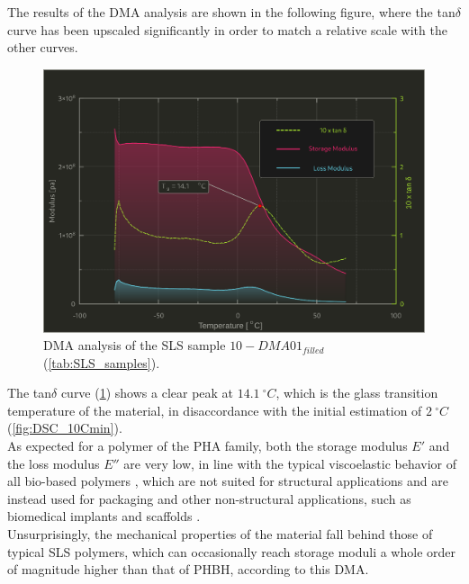 \documentclass{article}
\begin{document}
    The results of the DMA analysis are shown in the following figure, where the tan$\delta$ curve has been upscaled significantly 
    in order to match a relative scale with the other curves. \\ 

    \begin{figure}[h!]
        \centering
        \includegraphics[width=\textwidth]{Pictures/Thermal_analysis_plots/DMA.eps}
        \caption{DMA analysis of the SLS sample $10-DMA01_{filled}$ (\ref{tab:SLS_samples}).}
        \label{fig:DMA_plot}
    \end{figure}

    \clearpage 

    The tan$\delta$ curve (\ref{fig:DMA_plot}) shows a clear peak at $14.1 \ ^{\circ}C$, which is the glass transition temperature of the material, 
    in disaccordance with the initial estimation of $2 \ ^{\circ}C$ (\ref{fig:DSC_10Cmin}). \\ 

    As expected for a polymer of the PHA family, both the storage modulus $E'$ and the loss modulus $E''$ are very low, in line with the 
    typical viscoelastic behavior of all bio-based polymers \autocites{Kovalcik_PHA_Review}, which are not suited for structural applications and 
    are instead used for packaging and other non-structural applications, such as biomedical implants and scaffolds \autocites{Messori_Bondioli_PHAs}. \\

    Unsurprisingly, the mechanical properties of the material fall behind those of typical SLS polymers, which can 
    occasionally reach storage moduli a whole order of magnitude higher than that of PHBH, according to this DMA. \\ 
    
\end{document}
